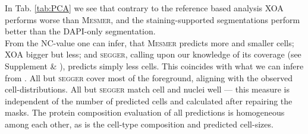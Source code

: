 % 
% 
% 
% 
% 
In Tab. \ref{tab:PCA} we see that contrary to the reference based analysis \textsc{XOA} performs worse than \textsc{Mesmer}, and the staining-supported segmentations perform better than the DAPI-only segmentation.\\
From the NC-value one can infer, that \textsc{Mesmer} predicts more and smaller cells; \textsc{XOA} bigger but less; and \textsc{segger}, calling upon our knowledge of its coverage (see Supplement  \& ), predicts simply less cells. This coincides with what we can infere from . All but \textsc{segger} cover most of the foreground, aligning with the observed cell-distributions. All but \textsc{segger} match cell and nuclei well --- this measure is independent of the number of predicted cells and calculated after repairing the masks. The protein composition evaluation of all predictions is homogeneous among each other, as is the cell-type composition and predicted cell-sizes.\\
